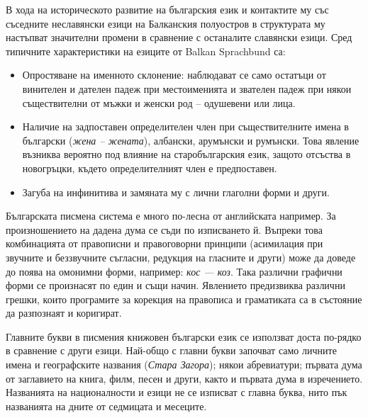 \documentclass[]{../../metanetpaper}
\begin{document}
\begin{multicols}{2}
В хода на историческото развитие на българския език и
 контактите му със съседните неславянски езици на Балканския полуостров в структурата му настъпват значителни промени в сравнение с останалите славянски
 езици. Сред типичните характеристики на езиците от
 Balkan Sprachbund са:

\begin{itemize}
\item Опростяване на именното склонение: наблюдават се
 само остатъци от винителен и дателен падеж при
 местоименията и звателен падеж при някои съществителни от мъжки и женски род – одушевени
 или лица.

\item Наличие на задпоставен определителен член при съществителните имена в български ({\it жена – жената}),
 албански, арумънски и румънски. Това явление възниква вероятно под влияние на старобългарския език,
 защото отсъства в новогръцки, където определителният член е предпоставен.

\item Загуба на инфинитива и замяната му с лични
глаголни форми и други. 
\end{itemize}


Българската писмена система е много по-лесна
 от
 английската
 например.
 За произношението на дадена дума се съди по изписването
 й. Въпреки това комбинацията от правописни и
 правоговорни принципи (асимилация при звучните и
 беззвучните съгласни, редукция на гласните и други)
 може да доведе до поява на омонимни форми, например:
\textit{кос — коз}. Така различни графични форми се произнасят
 по един и същи начин. Явлението предизвиква различни
 грешки, които програмите за корекция на правописа и
граматиката са в състояние да разпознаят и коригират.

Главните букви в писмения книжовен български език се използват доста по-рядко в сравнение с други езици. Най-общо с главни букви започват само личните имена и географските названия
 ({\it Стара Загора}); някои абревиатури; първата дума от
 заглавието на книга, филм, песен и други, както и първата дума в 
изречението. Названията на
 националности и езици не се изписват с главна буква,
 нито пък названията на дните от
 седмицата и месеците.


\end{multicols}
\end{document}
